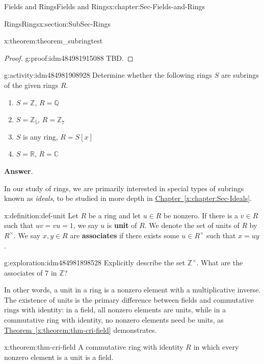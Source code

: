 \documentclass[oneside,10pt,]{book}
\newcommand{\blocktitlefont}{\relax}
\newcommand{\xreffont}{\relax}
\newcommand{\terminology}[1]{\textbf{#1}}
\numberwithin{equation}{section}
\def\C{{\mathbb C}}
\def\Z{{\mathbb Z}}
\def\Q{{\mathbb Q}}
\def\R{{\mathbb R}}
\begin{document}
\begin{chapterptx}{Fields and Rings}{}{Fields and Rings}{}{}{x:chapter:Sec-Fields-and-Rings}
\begin{sectionptx}{Rings}{}{Rings}{}{}{x:section:SubSec-Rings}
\begin{theorem}{}{}{x:theorem:theorem_subringtest}
\begin{enumerate}
\end{enumerate}
%
\end{theorem}
\begin{proof}{}{g:proof:idm484981915088}
TBD.%
\end{proof}
\begin{activity}{}{g:activity:idm484981908928}%
Determine whether the following rings \(S\) are subrings of the given rings \(R\).%
\begin{enumerate}
\item{}\(S = \Z\), \(R = \Q\)%
\item{}\(S = \Z_{5}\), \(R = \Z_{7}\)%
\item{}\(S\) is any ring, \(R = S[x]\)%
\item{}\(S = \R\), \(R = \C\)%
\end{enumerate}
%
\par\smallskip%
\noindent\textbf{\blocktitlefont Answer}.\hypertarget{g:answer:idm484981901008}{}\quad{}\end{activity}
In our study of rings, we are primarily interested in special types of subrings known as \emph{ideals}, to be studied in more depth in \hyperref[x:chapter:Sec-Ideals]{Chapter~{\xreffont\ref{x:chapter:Sec-Ideals}}}.%
\begin{definition}{}{x:definition:def-unit}%
%
%
Let \(R\) be a ring and let \(u\in R\) be nonzero. If there is a \(v\in R\) such that \(uv = vu = 1\), we say \(u\) is \terminology{unit} of \(R\). We denote the set of units of \(R\) by \(R^\times\). We say \(x,y\in R\) are \terminology{associates} if there exists some \(u\in R^\times\) such that \(x = uy\).%
\end{definition}
\begin{exploration}{}{g:exploration:idm484981898528}%
Explicitly describe the set \(\Z^\times\). What are the associates of 7 in \(\Z\)?%
\end{exploration}
In other words, a unit in a ring is a nonzero element with a multiplicative inverse. The existence of units is the primary difference between fields and commutative rings with identity: in a field, all nonzero elements are units, while in a commutative ring with identity, no nonzero elements need be units, as \hyperref[x:theorem:thm-cri-field]{Theorem~{\xreffont\ref{x:theorem:thm-cri-field}}} demonstrates.%
\begin{theorem}{}{}{x:theorem:thm-cri-field}%
A commutative ring with identity \(R\) in which every nonzero element is a unit is a field.%
\end{theorem}

\end{sectionptx}
\end{chapterptx}
\end{document}
